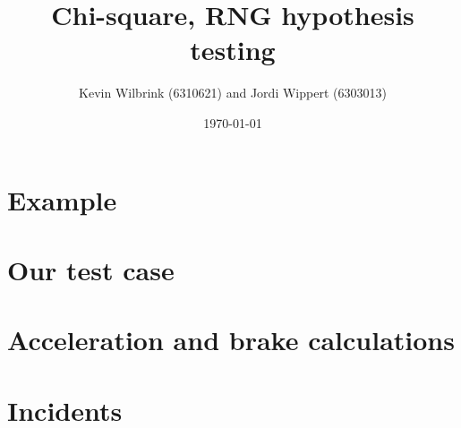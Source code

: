 \documentclass[12pt]{article}
\title{\textbf{Chi-square, RNG hypothesis testing}}
\date{\today}
\author{Kevin Wilbrink (6310621) and Jordi Wippert (6303013)}
\begin{document}
	\maketitle

	\begin{multicols*}{2}
		\section{Example}
		
		\section{Our test case}
		
    \section{Acceleration and brake calculations}
		
    \section{Incidents}
		
		\printbibliography
	\end{multicols*}
\end{document}
